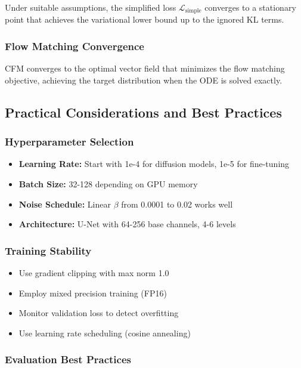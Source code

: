 \documentclass[a4paper,12pt]{article}
\begin{document}
Under suitable assumptions, the simplified loss $\mathcal{L}_{\text{simple}}$ converges to a stationary point that achieves the variational lower bound up to the ignored KL terms.

\subsubsection{Flow Matching Convergence}

CFM converges to the optimal vector field that minimizes the flow matching objective, achieving the target distribution when the ODE is solved exactly.

\subsection{Practical Considerations and Best Practices}

\subsubsection{Hyperparameter Selection}

\begin{itemize}
    \item \textbf{Learning Rate:} Start with 1e-4 for diffusion models, 1e-5 for fine-tuning
    \item \textbf{Batch Size:} 32-128 depending on GPU memory
    \item \textbf{Noise Schedule:} Linear $\beta$ from 0.0001 to 0.02 works well
    \item \textbf{Architecture:} U-Net with 64-256 base channels, 4-6 levels
\end{itemize}

\subsubsection{Training Stability}

\begin{itemize}
    \item Use gradient clipping with max norm 1.0
    \item Employ mixed precision training (FP16)
    \item Monitor validation loss to detect overfitting
    \item Use learning rate scheduling (cosine annealing)
\end{itemize}

\subsubsection{Evaluation Best Practices}
\end{document}
